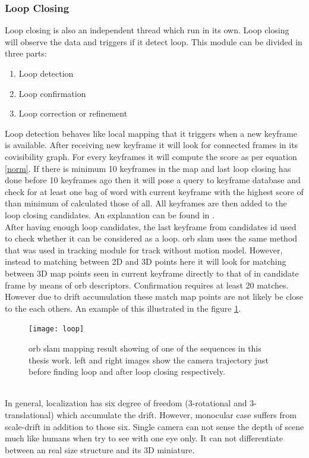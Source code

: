 \subsubsection{Loop Closing} 
Loop closing is also an independent thread which run in its own. Loop closing will observe the data and triggers if it detect loop. This module can be divided in three parts:
\begin{enumerate}
	\item Loop detection
	\item Loop confirmation
	\item Loop correction or refinement
\end{enumerate}
Loop detection behaves like local mapping that it triggers when a new keyframe is available. After receiving new keyframe it will look for connected frames in its covisibility graph.
For every keyframes it will compute the score as per equation \ref{norm}. If there is minimum 10 keyframes in the map and last loop closing has done before 10 keyframes ago then it will pose a query to keyframe database and check for at least one bag of word with current keyframe with the highest score of than minimum of calculated those of all. All keyframes are then added to the loop closing candidates. An explanation can be found in \cite{chris}.\\
\newline
After having enough loop candidates, the last keyframe from candidates id used to check whether it can be considered as a loop. \acrshort{orb} \acrshort{slam} uses the same method that was used in tracking module for track without motion model. However, instead to matching between 2D and 3D points here it will look for matching between 3D map points seen in current keyframe directly to that of in candidate frame by means of \acrshort{orb} descriptors. Confirmation requires at least 20 matches. However due to drift accumulation these match map points are not likely be close to the each others. An example of this illustrated in the figure \ref{fig:loop}.\\
\begin{figure}[h]
	\centering
	\texttt{[image: loop]}
	\caption{\acrshort{orb} \acrshort{slam} mapping result showing of one of the sequences in this thesis work. left and right images show the camera trajectory just before finding loop and after loop closing respectively.}
	\label{fig:loop}
\end{figure}
\\
In general, localization has six degree of freedom (3-rotational and 3-translational) which accumulate the drift. However, monocular case suffers from scale-drift in addition to those six. Single camera can not sense the depth of scene much like humans when try to see with one eye only. It can not differentiate between an real size structure and its 3D miniature.
